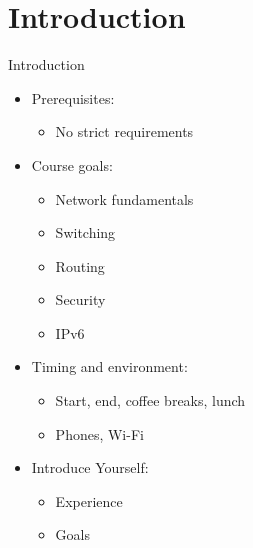 \section[intro]{Introduction}

\begin{frame}{Introduction}
	\begin{itemize}[<+->]
		\item Prerequisites:
		\begin{itemize}
			\item No strict requirements
		\end{itemize}
		\item Course goals:
		\begin{itemize}
			\item Network fundamentals
			\item Switching
			\item Routing
			\item Security
			\item IPv6
		\end{itemize}
		\item Timing and environment:
		\begin{itemize}
			\item Start, end, coffee breaks, lunch
			\item Phones, Wi-Fi
		\end{itemize}
		\item Introduce Yourself:
		\begin{itemize}
			\item Experience
			\item Goals
		\end{itemize}
	\end{itemize}
\end{frame}
